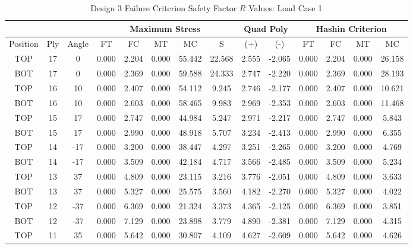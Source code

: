 \begin{landscape}
\begin{table}
\centering
\caption{Design 3 Failure Criterion Safety Factor $R$ Values: Load Case 1}
\label{tab:q3r1}
\begin{tabular}{|ccc|ccccc|cc|cccc|}
\toprule
 & & & \multicolumn{5}{|c|}{Maximum Stress} & \multicolumn{2}{|c|}{Quad Poly} & \multicolumn{4}{|c|}{Hashin Criterion} \\
\midrule
Position & Ply & Angle & FT & FC & MT & MC & S & (+) & (-) & FT & FC & MT & MC \\
\midrule
TOP  & 17 &   0 &   0.000 &   2.204 &   0.000 &  55.442 & 22.568 & 2.555 & -2.065 &    0.000 &    2.204 &    0.000 &   26.158 \\
BOT  & 17 &   0 &   0.000 &   2.369 &   0.000 &  59.588 & 24.333 & 2.747 & -2.220 &    0.000 &    2.369 &    0.000 &   28.193 
\\
TOP  & 16 &  10 &   0.000 &   2.407 &   0.000 &  54.112 &  9.245 & 2.746 & -2.177 &    0.000 &    2.407 &    0.000 &   10.621 \\
BOT & 16 &  10 &   0.000 &   2.603 &   0.000 &  58.465 &  9.983 & 2.969 & -2.353 &    0.000 &    2.603 &    0.000 &   11.468 \\
TOP & 15 &  17 &   0.000 &   2.747 &   0.000 &  44.984 &  5.247 & 2.971 & -2.217 &    0.000 &    2.747 &    0.000 &    5.843 \\
BOT & 15 &  17 &   0.000 &   2.990 &   0.000 &  48.918 &  5.707 & 3.234 & -2.413 &    0.000 &    2.990 &    0.000 &    6.355 \\
TOP  & 14 & -17 &   0.000 &   3.200 &   0.000 &  38.447 &  4.297 & 3.251 & -2.265 &    0.000 &    3.200 &    0.000 &    4.769 \\
BOT  & 14 & -17 &   0.000 &   3.509 &   0.000 &  42.184 &  4.717 & 3.566 & -2.485 &    0.000 &    3.509 &    0.000 &    5.234 \\
TOP  & 13 &  37 &   0.000 &   4.809 &   0.000 &  23.115 &  3.216 & 3.776 & -2.051 &    0.000 &    4.809 &    0.000 &    3.633 \\
BOT & 13 &  37 &   0.000 &   5.327 &   0.000 &  25.575 &  3.560 & 4.182 & -2.270 &    0.000 &    5.327 &    0.000 &    4.022 \\
TOP & 12 & -37 &   0.000 &   6.369 &   0.000 &  21.324 &  3.373 & 4.365 & -2.125 &    0.000 &    6.369 &    0.000 &    3.851 \\
BOT & 12 & -37 &   0.000 &   7.129 &   0.000 &  23.898 &  3.779 & 4.890 & -2.381 &    0.000 &    7.129 &    0.000 &    4.315 \\
TOP & 11 &  35 &   0.000 &   5.642 &   0.000 &  30.807 &  4.109 & 4.627 & -2.609 &    0.000 &    5.642 &    0.000 &    4.626 \\

\end{tabular}
\end{table}
\end{landscape}
